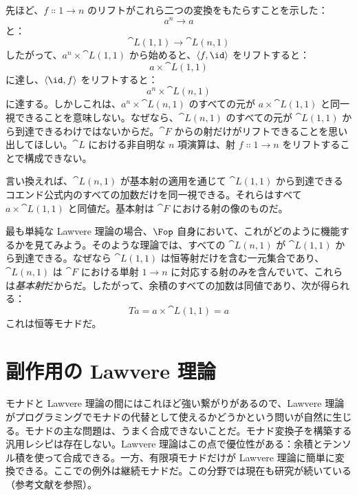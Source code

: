 \begin{figure}[H]
  \centering
\end{figure}

\noindent
先ほど、$f \Colon 1 \to n$ のリフトがこれら二つの変換をもたらすことを示した：
\[a^n \to a\]
と：
\[\cat{L}(1, 1) \to \cat{L}(n, 1)\]
したがって、$a^n \times \cat{L}(1, 1)$ から始めると、$\langle f, \id \rangle$ をリフトすると：
\[a \times \cat{L}(1, 1)\]
に達し、$\langle \id, f \rangle$ をリフトすると：
\[a^n \times \cat{L}(n, 1)\]
に達する。しかしこれは、$a^n \times \cat{L}(n, 1)$ のすべての元が $a \times \cat{L}(1, 1)$ と同一視できることを意味しない。なぜなら、$\cat{L}(n, 1)$ のすべての元が $\cat{L}(1, 1)$ から到達できるわけではないからだ。$\cat{F}$ からの射だけがリフトできることを思い出してほしい。$\cat{L}$ における非自明な $n$ 項演算は、射 $f \Colon 1 \to n$ をリフトすることで構成できない。

言い換えれば、$\cat{L}(n, 1)$ が基本射の適用を通じて $\cat{L}(1, 1)$ から到達できるコエンド公式内のすべての加数だけを同一視できる。それらはすべて $a \times \cat{L}(1, 1)$ と同値だ。基本射は $\cat{F}$ における射の像のものだ。

最も単純な Lawvere 理論の場合、$\Fop$ 自身において、これがどのように機能するかを見てみよう。そのような理論では、すべての $\cat{L}(n, 1)$ が $\cat{L}(1, 1)$ から到達できる。なぜなら $\cat{L}(1, 1)$ は恒等射だけを含む一元集合であり、$\cat{L}(n, 1)$ は $\cat{F}$ における単射 $1 \to n$ に対応する射のみを含んでいて、これらは\emph{基本射}だからだ。したがって、余積のすべての加数は同値であり、次が得られる：
\[T a = a \times \cat{L}(1, 1) = a\]
これは恒等モナドだ。

\section{副作用の Lawvere 理論}

モナドと Lawvere 理論の間にはこれほど強い繋がりがあるので、Lawvere 理論がプログラミングでモナドの代替として使えるかどうかという問いが自然に生じる。モナドの主な問題は、うまく合成できないことだ。モナド変換子を構築する汎用レシピは存在しない。Lawvere 理論はこの点で優位性がある：余積とテンソル積を使って合成できる。一方、有限項モナドだけが Lawvere 理論に簡単に変換できる。ここでの例外は継続モナドだ。この分野では現在も研究が続いている（参考文献を参照）。

